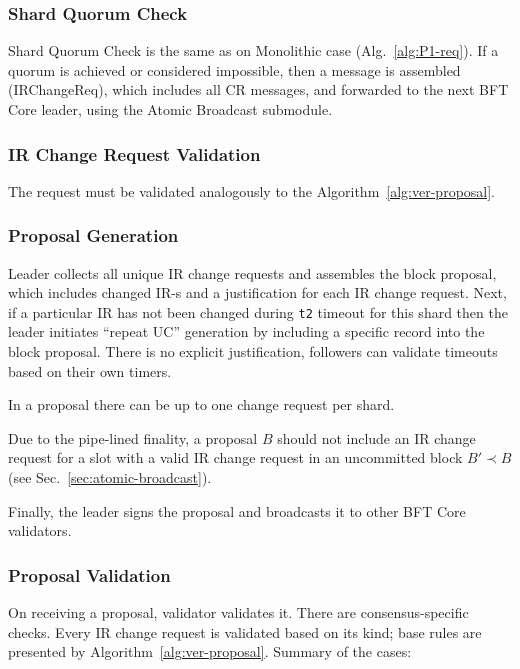 \subsubsection{Shard Quorum Check}

Shard Quorum Check is the same as on Monolithic case (Alg.~\ref{alg:P1-req}). If a quorum is achieved or considered impossible, then a message is assembled (IRChangeReq), which includes all CR messages, and forwarded to the next BFT Core leader, using the Atomic Broadcast submodule.

\subsubsection{IR Change Request Validation}

The request must be validated analogously to the Algorithm~\ref{alg:ver-proposal}.

\subsubsection{Proposal Generation}

Leader collects all unique IR change requests and assembles the block proposal, which includes changed IR-s and a justification for each IR change request.
Next, if a particular IR has not been changed during \texttt{t2} timeout for this shard then the leader initiates ``repeat UC'' generation by including a specific record into the block proposal. There is no explicit justification, followers can validate timeouts based on their own timers.

In a proposal there can be up to one change request per shard.

Due to the pipe-lined finality, a proposal $B$ should not include an IR change request for a slot with a valid IR change request in an uncommitted block $B' \prec B$ (see Sec.~\ref{sec:atomic-broadcast}). %

Finally, the leader signs the proposal and broadcasts it to other BFT Core validators.

\subsubsection{Proposal Validation}

On receiving a proposal, validator validates it. There are consensus-specific checks. Every IR change request is validated based on its kind; base rules are presented by Algorithm~\ref{alg:ver-proposal}. Summary of the cases:

